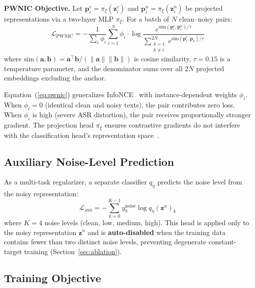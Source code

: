 \documentclass[conference]{IEEEtran}
\begin{document}
\textbf{PWNIC Objective.} Let $\mathbf{p}_i^c = \pi_\xi(\mathbf{z}_i^c)$ and $\mathbf{p}_i^n = \pi_\xi(\mathbf{z}_i^n)$ be projected representations via a two-layer MLP $\pi_\xi$. For a batch of $N$ clean--noisy pairs:
\begin{equation}
\mathcal{L}_{\text{PWNIC}} = -\frac{1}{\sum_{i} \phi_i}
\sum_{i=1}^{N} \phi_i \cdot
\log \frac{e^{\text{sim}(\mathbf{p}_i^c, \mathbf{p}_i^n) / \tau}}
          {\displaystyle\sum_{\substack{k=1 \\ k \neq i}}^{2N}
           e^{\text{sim}(\mathbf{p}_i^c, \mathbf{p}_k) / \tau}}
\label{eq:pwnic}
\end{equation}
where $\text{sim}(\mathbf{a}, \mathbf{b}) = \mathbf{a}^\top \mathbf{b} / (\|\mathbf{a}\| \|\mathbf{b}\|)$ is cosine similarity, $\tau = 0.15$ is a temperature parameter, and the denominator sums over all $2N$ projected embeddings excluding the anchor.

Equation~(\ref{eq:pwnic}) generalizes InfoNCE~\cite{oord2018representation} with instance-dependent weights $\phi_i$. When $\phi_i = 0$ (identical clean and noisy texts), the pair contributes zero loss. When $\phi_i$ is high (severe ASR distortion), the pair receives proportionally stronger gradient. The projection head $\pi_\xi$ ensures contrastive gradients do not interfere with the classification head's representation space~\cite{chen2020simclr}.

\subsection{Auxiliary Noise-Level Prediction}

As a multi-task regularizer, a separate classifier $q_\eta$ predicts the noise level from the noisy representation:
\begin{equation}
    \mathcal{L}_\text{aux} = -\sum_{k=0}^{K-1} y_k^{\text{noise}} \log q_\eta(\mathbf{z}^n)_k
    \label{eq:aux}
\end{equation}
where $K = 4$ noise levels (clean, low, medium, high). This head is applied only to the noisy representation $\mathbf{z}^n$ and is \textbf{auto-disabled} when the training data contains fewer than two distinct noise levels, preventing degenerate constant-target training (Section~\ref{sec:ablation}).

\subsection{Training Objective}
\end{document}
